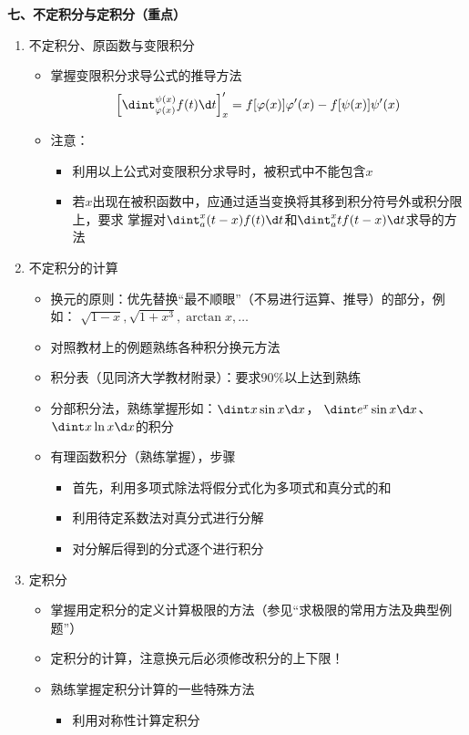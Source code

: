 \bigskip

{\bf 七、不定积分与定积分（重点）}
\begin{enumerate}
  \item 不定积分、原函数与变限积分
  \begin{itemize}
    \item 掌握变限积分求导公式的推导方法
    $$\left[\dint_{\varphi(x)}^{\psi(x)}f(t)\d t\right]'_x
	=f[\varphi(x)]\varphi'(x)-f[\psi(x)]\psi'(x)$$
	\item 注意：
	\begin{itemize}
	  \item 利用以上公式对变限积分求导时，被积式中不能包含$x$
	  \item 若$x$出现在被积函数中，应通过适当变换将其移到积分符号外或积分限上，要求
	  掌握对$\dint_a^x(t-x)f(t)\d t$和$\dint_a^xtf(t-x)\d t$求导的方法
	\end{itemize}
  \end{itemize}
  \item 不定积分的计算
  \begin{itemize}
    \item 换元的原则：优先替换“最不顺眼”（不易进行运算、推导）的部分，例如：
    $\sqrt{1-x},\sqrt{1+x^3},\arctan x,\ldots$
    \item 对照教材上的例题熟练各种积分换元方法
    \item 积分表（见同济大学教材附录）：要求$90\%$以上达到熟练
	\item 分部积分法，熟练掌握形如：$\dint x\sin x\d x$，
	$\dint e^x\sin x\d x$、$\dint x\ln x\d x$的积分
	\item 有理函数积分（熟练掌握），步骤
	\begin{itemize}
	  \item 首先，利用多项式除法将假分式化为多项式和真分式的和
	  \item 利用待定系数法对真分式进行分解
	  \item 对分解后得到的分式逐个进行积分
	\end{itemize}
  \end{itemize}
  \item 定积分
  \begin{itemize}
    \item 掌握用定积分的定义计算极限的方法（参见“求极限的常用方法及典型例题”）
    \item 定积分的计算，注意换元后必须修改积分的上下限！
    \item 熟练掌握定积分计算的一些特殊方法
  	\begin{itemize} 
	  \item 利用对称性计算定积分

\end{itemize}
\end{itemize}
\end{enumerate}
